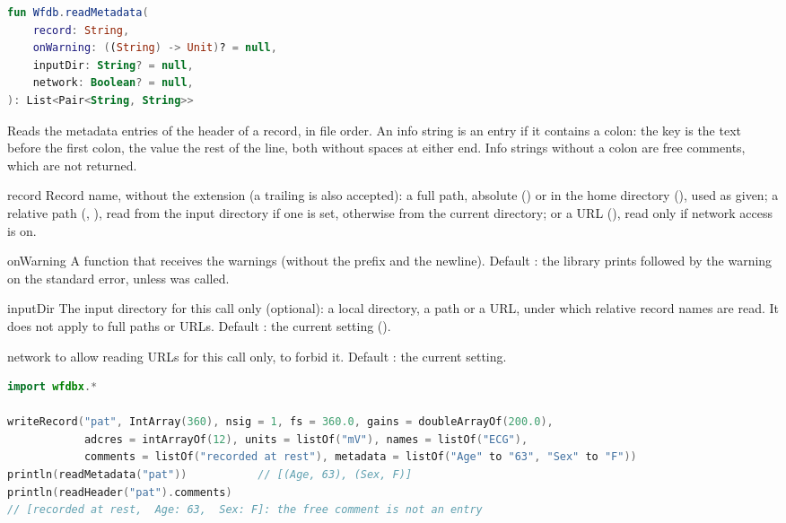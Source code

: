 \begin{lstlisting}[language=Kotlin,style=signature]
fun Wfdb.readMetadata(
    record: String,
    onWarning: ((String) -> Unit)? = null,
    inputDir: String? = null,
    network: Boolean? = null,
): List<Pair<String, String>>
\end{lstlisting}
Reads the metadata entries of the header of a record, in file order. An info string is an
entry if it contains a colon: the key is the text before the first colon, the value the
rest of the line, both without spaces at either end. Info strings without a colon are free
comments, which are not returned.
\begin{params}
\item[record] Record name, without the  extension (a trailing  is
  also accepted): a full path, absolute () or in the home
  directory (), used as given; a relative path
  (, ), read from the input directory if one is set,
  otherwise from the current directory; or a URL
  (), read only if network access is
  on.
\item[onWarning] A function that receives the warnings (without the 
  prefix and the newline). Default : the library prints 
  followed by the warning on the standard error, unless  was called.
\item[inputDir] The input directory for this call only (optional): a local directory, a
  \code{\textasciitilde} path or a URL, under which relative record names are read. It
  does not apply to full paths or URLs. Default : the current setting
  ().
\item[network]  to allow reading URLs for this call only,  to
  forbid it. Default : the current setting.
\end{params}
\begin{lstlisting}[language=Kotlin,style=example]
import wfdbx.*

writeRecord("pat", IntArray(360), nsig = 1, fs = 360.0, gains = doubleArrayOf(200.0),
            adcres = intArrayOf(12), units = listOf("mV"), names = listOf("ECG"),
            comments = listOf("recorded at rest"), metadata = listOf("Age" to "63", "Sex" to "F"))
println(readMetadata("pat"))           // [(Age, 63), (Sex, F)]
println(readHeader("pat").comments)
// [recorded at rest,  Age: 63,  Sex: F]: the free comment is not an entry
\end{lstlisting}

